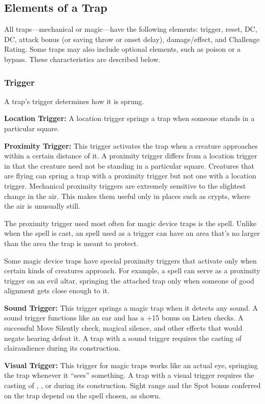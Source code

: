 \subsection{Elements of a Trap}
All traps---mechanical or magic---have the following elements: trigger, reset,  DC,  DC, attack bonus (or saving throw or onset delay), damage/effect, and Challenge Rating. Some traps may also include optional elements, such as poison or a bypass. These characteristics are described below.

\subsubsection{Trigger}
A trap's trigger determines how it is sprung.

\textbf{Location Trigger:} A location trigger springs a trap when someone stands in a particular square.

\textbf{Proximity Trigger:} This trigger activates the trap when a creature approaches within a certain distance of it. A proximity trigger differs from a location trigger in that the creature need not be standing in a particular square. Creatures that are flying can spring a trap with a proximity trigger but not one with a location trigger. Mechanical proximity triggers are extremely sensitive to the slightest change in the air. This makes them useful only in places such as crypts, where the air is unusually still.

The proximity trigger used most often for magic device traps is the  spell. Unlike when the spell is cast, an  spell used as a trigger can have an area that's no larger than the area the trap is meant to protect.

Some magic device traps have special proximity triggers that activate only when certain kinds of creatures approach. For example, a  spell can serve as a proximity trigger on an evil altar, springing the attached trap only when someone of good alignment gets close enough to it.

\textbf{Sound Trigger:} This trigger springs a magic trap when it detects any sound. A sound trigger functions like an ear and has a +15 bonus on Listen checks. A successful Move Silently check, magical silence, and other effects that would negate hearing defeat it. A trap with a sound trigger requires the casting of clairaudience during its construction.

\textbf{Visual Trigger:} This trigger for magic traps works like an actual eye, springing the trap whenever it ``sees'' something. A trap with a visual trigger requires the casting of , , or  during its construction. Sight range and the Spot bonus conferred on the trap depend on the spell chosen, as shown.


